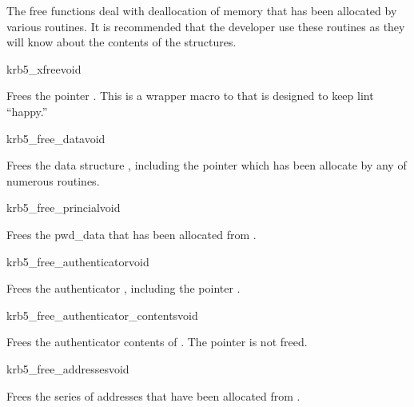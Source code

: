 The free functions deal with deallocation of memory that has been
allocated by various routines. It is recommended that the developer use
these routines as they will know about the contents of the structures.

\begin{funcdecl}{krb5_xfree}{void}{\funcinout}
\end{funcdecl}

Frees the pointer . This is a wrapper macro to
 that is designed to keep lint ``happy.''

\begin{funcdecl}{krb5_free_data}{void}{\funcinout}
\end{funcdecl}

Frees the data structure , including the pointer
 which has been allocate by any of numerous routines.


\begin{funcdecl}{krb5_free_princial}{void}{\funcinout}
\end{funcdecl}

Frees the pwd_data  that has been allocated from
. 

\begin{funcdecl}{krb5_free_authenticator}{void}{\funcinout}
\end{funcdecl}

Frees the authenticator , including the pointer
. 

\begin{funcdecl}{krb5_free_authenticator_contents}{void}{\funcinout}
\end{funcdecl}

Frees the authenticator contents of . The pointer 
 is not freed.


\begin{funcdecl}{krb5_free_addresses}{void}{\funcinout}
\end{funcdecl}

Frees the series of addresses  that have been allocated from
. 

